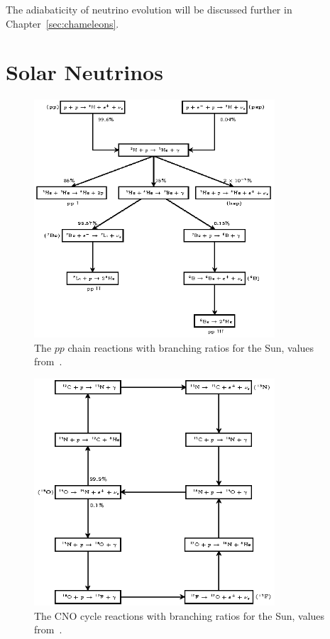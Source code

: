 The adiabaticity of neutrino evolution will be discussed further in
Chapter~\ref{sec:chameleons}.

\section{Solar Neutrinos}
\begin{figure}[htbp]
\centering
\includegraphics[width=0.8\textwidth]{pp_chain}
\caption[$pp$ Chain Solar Reactions]{The $pp$ chain reactions with
branching ratios for the Sun, values from~\cite{bahcall_book}.}
\label{fig:pp_chain}
\end{figure}
\begin{figure}[htbp]
\centering
\includegraphics[width=0.8\textwidth]{cno_cycle}
\caption[CNO Cycle Solar Reactions]{The CNO cycle reactions with
branching ratios for the Sun, values from~\cite{bahcall_book}.}
\label{fig:cno_cycle}
\end{figure}
